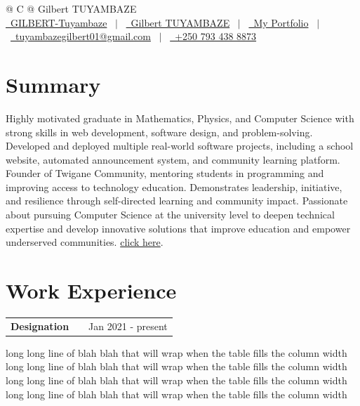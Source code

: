 \documentclass[a4paper,12pt]{article}
\makeatletter
\newenvironment{jobshort}[2]
    {
    \begin{tabularx}{\linewidth}{@{}l X r@{}}
    \textbf{#1} & \hfill &  #2 \\[3.75pt]
    \end{tabularx}
    }
    {
    }
\makeatother
\begin{document}
\pagestyle{empty} 


\begin{tabularx}{\linewidth}{@{} C @{}}
\Huge{Gilbert TUYAMBAZE} \\[7.5pt]
\href{https://github.com/GILBERT-Tuyambaze}{\raisebox{-0.05\height}\faGithub\ GILBERT-Tuyambaze} \ $|$ \ 
\href{https://www.linkedin.com/in/gilbert-tuyambaze-02044a3bb/}{\raisebox{-0.05\height}\faLinkedin\ Gilbert TUYAMBAZE} \ $|$ \ 
\href{https://tuyambaze-gilbert.vercel.app}{\raisebox{-0.05\height}\faGlobe \ My Portfolio} \ $|$ \ 
\href{mailto:tuyambazegilbert01@gmail.com}{\raisebox{-0.05\height}\faEnvelope \ tuyambazegilbert01@gmail.com} \ $|$ \ 
\href{tel:+250793438873}{\raisebox{-0.05\height}\faMobile \ +250 793 438 8873} \\
\end{tabularx}

\section{Summary}
Highly motivated graduate in Mathematics, Physics, and Computer Science with strong
skills in web development, software design, and problem-solving. Developed and deployed
multiple real-world software projects, including a school website, automated
announcement system, and community learning platform. Founder of Twigane
Community, mentoring students in programming and improving access to technology
education. Demonstrates leadership, initiative, and resilience through self-directed
learning and community impact. Passionate about pursuing Computer Science at the
university level to deepen technical expertise and develop innovative solutions that
improve education and empower underserved communities.
 \href{https://github.com/jitinnair1/autoCV}{click here}.

\section{Work Experience}

\begin{jobshort}{Designation}{Jan 2021 - present}
long long line of blah blah that will wrap when the table fills the column width long long line of blah blah that will wrap when the table fills the column width long long line of blah blah that will wrap when the table fills the column width long long line of blah blah that will wrap when the table fills the column width
\end{jobshort}
\end{document}

